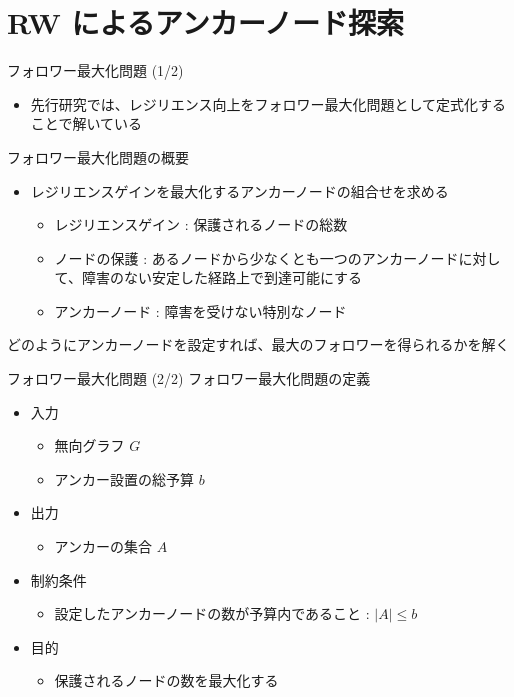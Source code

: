 \documentclass[compress,dvipdfmx,11pt]{beamer}
\begin{document}
\section{RW によるアンカーノード探索}
\label{sec:org0282284}
\begin{frame}[label={sec:orgd25499c}]{フォロワー最大化問題 (1/2)}
\begin{itemize}
\item 先行研究では、レジリエンス向上をフォロワー最大化問題として定式化することで解いている
\end{itemize}

フォロワー最大化問題の概要
\begin{itemize}
\item レジリエンスゲインを最大化するアンカーノードの組合せを求める
\begin{itemize}
\item レジリエンスゲイン : 保護されるノードの総数
\item ノードの保護 : あるノードから少なくとも一つのアンカーノードに対し
て、障害のない安定した経路上で到達可能にする
\item アンカーノード : 障害を受けない特別なノード
\end{itemize}
\end{itemize}

どのようにアンカーノードを設定すれば、最大のフォロワーを得られるかを解く
\end{frame}
\begin{frame}[label={sec:orged383bc}]{フォロワー最大化問題 (2/2)}
フォロワー最大化問題の定義
\begin{itemize}
\item 入力
\begin{itemize}
\item 無向グラフ \(G\)
\item アンカー設置の総予算 \(b\)
\end{itemize}

\item 出力
\begin{itemize}
\item アンカーの集合 \(A\)
\end{itemize}

\item 制約条件
\begin{itemize}
\item 設定したアンカーノードの数が予算内であること : \(|A| \leq b\)
\end{itemize}

\item 目的
\begin{itemize}
\item 保護されるノードの数を最大化する
\end{itemize}
\end{itemize}

\end{frame}
\end{document}
